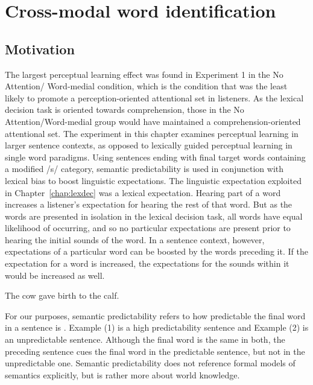 
\chapter{Cross-modal word identification}
\label{chap:sent}


\section{Motivation}

The largest perceptual learning effect was found in Experiment 1 in the No Attention/ Word-medial condition, which is the condition that was the least likely to promote a perception-oriented attentional set in listeners.
As the lexical decision task is oriented towards comprehension, those in the No Attention/Word-medial group would have maintained a comprehension-oriented attentional set. 
The experiment in this chapter examines perceptual learning in larger sentence contexts, as opposed to lexically guided perceptual learning in single word paradigms.
Using sentences ending with final target words containing a modified /s/ category, semantic predictability is used in conjunction with lexical bias to boost linguistic expectations.
The linguistic expectation exploited in Chapter~\ref{chap:lexdec} was a lexical expectation.
Hearing part of a word increases a listener's expectation for hearing the rest of that word.
But as the words are presented in isolation in the lexical decision task, all words have equal likelihood of occurring, and so no particular expectations are present prior to hearing the initial sounds of the word.
In a sentence context, however, expectations of a particular word can be boosted by the words preceding it.
If the expectation for a word is increased, the expectations for the sounds within it would be increased as well.

\ex[exno=1]
The cow gave birth to the calf.
\xe

For our purposes, semantic predictability refers to how predictable the final word in a sentence is \citep{Kalikow1977}.
Example (1) is a high predictability sentence and Example (2) is an unpredictable sentence.
Although the final word is the same in both, the preceding sentence cues the final word in the predictable sentence, but not in the unpredictable one.
Semantic predictability does not reference formal models of semantics explicitly, but is rather more about world knowledge.

